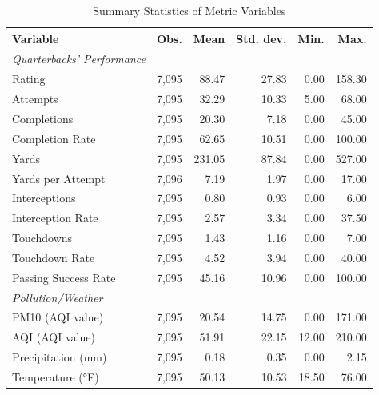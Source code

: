 \documentclass[12pt,a4paper]{article}
\begin{document}
\begin{table}[h]
 \centering
 \caption{Summary Statistics of Metric Variables}
 \label{tab:1}
 \begin{tabular}{lrrrrr}
 \hline \hline
 Variable & Obs. & Mean & Std. dev. & Min. & Max. \\
 \hline
 \textit{Quarterbacks' Performance} \\
 Rating & 7,095 & 88.47 & 27.83 & 0.00 & 158.30 \\
 Attempts & 7,095 & 32.29 & 10.33 & 5.00 & 68.00 \\
 Completions & 7,095 & 20.30 & 7.18 & 0.00 & 45.00 \\
 Completion Rate & 7,095 & 62.65 & 10.51 & 0.00 & 100.00 \\
 Yards & 7,095 & 231.05 & 87.84 & 0.00 & 527.00 \\
 Yards per Attempt & 7,096 & 7.19 & 1.97 & 0.00 & 17.00 \\
 Interceptions & 7,095 & 0.80 & 0.93 & 0.00 & 6.00 \\
 Interception Rate & 7,095 & 2.57 & 3.34 & 0.00 & 37.50 \\
 Touchdowns & 7,095 & 1.43 & 1.16 & 0.00 & 7.00 \\
 Touchdown Rate & 7,095 & 4.52 & 3.94 & 0.00 & 40.00 \\
 Passing Success Rate & 7,095 & 45.16 & 10.96 & 0.00 & 100.00 \\ [0.5cm]
 \textit{Pollution/Weather} \\
 PM10 (AQI value) & 7,095 & 20.54 & 14.75 & 0.00 & 171.00 \\
 AQI (AQI value) & 7,095 & 51.91 & 22.15 & 12.00 & 210.00 \\
 Precipitation (mm) & 7,095 & 0.18 & 0.35 & 0.00 & 2.15 \\
 Temperature (°F) & 7,095 & 50.13 & 10.53 & 18.50 & 76.00 \\
 \hline \hline
 \end{tabular}
\end{table}
\end{document}
